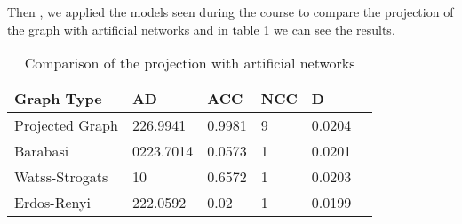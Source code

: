 \documentclass[sigchi]{acmart}
\begin{document}
Then , we applied the models seen during the course to compare the projection of the graph with artificial networks and in table \ref{table:2} we can see the results. 
\newline
\begin{table}[h!]
\begin{tabular}{|l|l|l|l|l|l|}
\hline
{Graph Type} & {AD} & {ACC} & {NCC}  & {D}  \\
\hline
Projected Graph   &226.9941  &0.9981 &9 &0.0204 \\
Barabasi      &0223.7014  &0.0573 &1  &0.0201 \\
Watss-Strogats   &10 &0.6572 &1 &0.0203 \\
Erdos-Renyi   &222.0592 &0.02 &1 &0.0199 \\

\hline

\end{tabular} 
\caption{Comparison of the projection with artificial networks}
\label{table:2}
\end{table}
\end{document}
